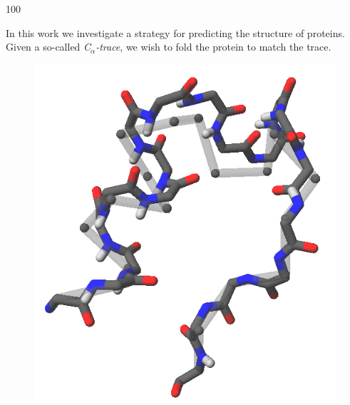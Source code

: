 \documentclass[a0,portrait]{a0poster}
\newcommand{\Ca}{C$_{\alpha}${}}
\begin{document}
\begin{GridBlock}{0}{21}{100}
\begin{multicols}{3}
\begin{multicols}{2}
In this work we investigate a strategy for predicting the structure of proteins. Given a so-called \emph{\Ca-trace}, we wish to fold the protein to match the trace.
\newpage
\begin{figure}
\vspace{2cm}
\hspace{-3cm}
\includegraphics[width=\columnwidth]{../rapport/figures/forside.png}
\end{figure}
\end{multicols}
\vspace{-1cm}




\end{multicols}
\end{GridBlock}
\end{document}
